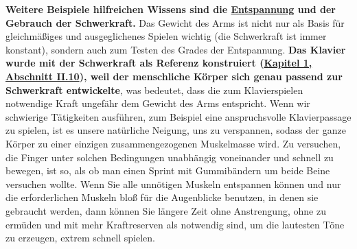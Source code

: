 \textbf{Weitere Beispiele hilfreichen Wissens sind die \hyperlink{c1ii14}{Entspannung} und der Gebrauch der Schwerkraft.}
 Das Gewicht des Arms ist nicht nur als Basis für gleichmäßiges und ausgeglichenes Spielen wichtig (die Schwerkraft ist immer konstant), sondern auch zum Testen des Grades der Entspannung.
 \textbf{Das Klavier wurde mit der Schwerkraft als Referenz konstruiert (\hyperlink{c1ii10}{Kapitel 1, Abschnitt II.10}), weil der menschliche Körper sich genau passend zur Schwerkraft entwickelte}, was bedeutet, dass die zum Klavierspielen notwendige Kraft ungefähr dem Gewicht des Arms entspricht.
 Wenn wir schwierige Tätigkeiten ausführen, zum Beispiel eine anspruchsvolle Klavierpassage zu spielen, ist es unsere natürliche Neigung, uns zu verspannen, sodass der ganze Körper zu einer einzigen zusammengezogenen Muskelmasse wird.
 Zu versuchen, die Finger unter solchen Bedingungen unabhängig voneinander und schnell zu bewegen, ist so, als ob man einen Sprint mit Gummibändern um beide Beine versuchen wollte.
 Wenn Sie alle unnötigen Muskeln entspannen können und nur die erforderlichen Muskeln bloß für die Augenblicke benutzen, in denen sie gebraucht werden, dann können Sie längere Zeit ohne Anstrengung, ohne zu ermüden und mit mehr Kraftreserven als notwendig sind, um die lautesten Töne zu erzeugen, extrem schnell spielen. 
 

